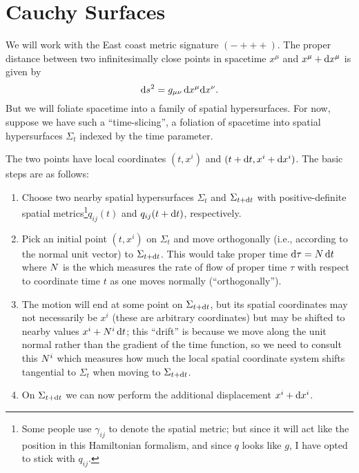 \section{Cauchy Surfaces}

We will work with the East coast metric signature $(-+++)$. The proper
distance between two infinitesimally close points in spacetime $x^{\mu}$
and $x^{\mu} + \mathrm{d} x^{\mu}$ is given by
\begin{equation}
\mathrm{d} s^{2} = g_{\mu\nu}\,\mathrm{d} x^{\mu}\mathrm{d} x^{\nu}.
\end{equation}
But we will foliate spacetime into a family of spatial
hypersurfaces. For now, suppose we have such a ``time-slicing'', a
foliation of spacetime into spatial hypersurfaces $\Sigma_{t}$ indexed
by the time parameter.

The two points have local coordinates $(t,x^{i})$ and $(t+\mathrm{d} t, x^{i} + \mathrm{d} x^{i})$.
The basic steps are as follows:
\begin{enumerate}
\item Choose two nearby spatial hypersurfaces $\Sigma_{t}$ and
  $\Sigma_{t+\mathrm{d} t}$ with positive-definite spatial metrics\footnote{Some
people use $\gamma_{ij}$ to denote the spatial metric; but since it will
act like the position in this Hamiltonian formalism, and since $q$ looks
like $g$, I have opted to stick with $q_{ij}$.}$q_{ij}(t)$
  and $q_{ij}(t + \mathrm{d} t)$, respectively.
\item Pick an initial point $(t, x^{i})$ on $\Sigma_{t}$ and move
  orthogonally (i.e., according to the normal unit vector) to
  $\Sigma_{t+\mathrm{d} t}$. This would take proper time $\mathrm{d}\tau=N\,\mathrm{d} t$ where
  $N$ is the  which measures the rate of flow of
  proper time $\tau$ with respect to coordinate time $t$ as one moves
  normally (``orthogonally'').
\item The motion will end at some point on $\Sigma_{t + \mathrm{d} t}$, but its
  spatial coordinates may not necessarily be $x^{i}$ (these are
  arbitrary coordinates) but may be shifted to nearby values
  $x^{i}+N^{i}\,\mathrm{d} t$; this ``drift'' is because we move along the unit
  normal rather than the gradient of the time function, so we need to
  consult this  $N^{i}$ which measures how much the
  local spatial coordinate system shifts tangential to $\Sigma_{t}$ when
  moving to $\Sigma_{t + \mathrm{d} t}$.
\item On $\Sigma_{t+\mathrm{d} t}$ we can now perform the additional
  displacement $x^{i} + \mathrm{d} x^{i}$.
\end{enumerate}
